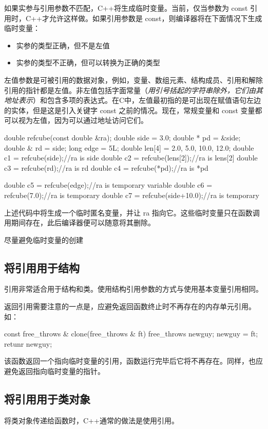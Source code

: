 如果实参与引用参数不匹配，C++将生成临时变量。当前，仅当参数为 const 引用时，C++才允许这样做。如果引用参数是 const，则编译器将在下面情况下生成临时变量：
\newenvironment{itemizepro}{\begin{itemize}%
	\setlength{\itemsep}{0pt}%
	\setlength{\parsep}{0pt}%
	\setlength{\parskip}{0pt}%
	}{\end{itemize}}
\begin{itemizepro}
	\item 实参的类型正确，但不是左值
	\item 实参的类型不正确，但可以转换为正确的类型
\end{itemizepro}
{\color{red}左值参数是可被引用的数据对象，例如，变量、数组元素、结构成员、引用和解除引用的指针都是左值。非左值包括字面常量（\emph{用引号括起的字符串除外，它们由其地址表示}）和包含多项的表达式。}在C中，左值最初指的是可出现在赋值语句左边的实体，但是这是引入关键字 const 之前的情况。现在，常规变量和 const 变量都可以视为左值，因为可以通过地址访问它们。
\begin{ccode}
double refcube(const double &ra);
double side = 3.0;
double * pd = &side;
double & rd = side;
long edge = 5L;
double len[4] = {2.0, 5.0, 10.0, 12.0};
double c1 = refcube(side);//ra is side
double c2 = refcube(lens[2]);//ra is lens[2]
double c3 = refcube(rd);//ra is rd
double c4 = refcube(*pd);//ra is *pd
\end{ccode}
\begin{ccode}
double c5 = refcube(edge);//ra is temporary variable
double c6 = refcube(7.0);//ra is temporary
double c7 = refcube(side+10.0);//ra is temporary
\end{ccode}
上述代码中将生成一个临时匿名变量，并让 ra 指向它。这些临时变量只在函数调用期间存在，此后编译器便可以随意将其删除。
\begin{marker}
尽量避免临时变量的创建
\end{marker}
\subsection{将引用用于结构}
引用非常适合用于结构和类。使用结构引用参数的方式与使用基本变量引用相同。

返回引用需要注意的一点是，应避免返回函数终止时不再存在的内存单元引用。如：
\begin{ccode}
const free_throws & clone(free_throws & ft)
{
	free_throws newguy;
	newguy = ft;
	retunr newguy;
}
\end{ccode}
该函数返回一个指向临时变量的引用，函数运行完毕后它将不再存在。同样，也应避免返回指向临时变量的指针。
\subsection{将引用用于类对象}
将类对象传递给函数时，C++通常的做法是使用引用。

